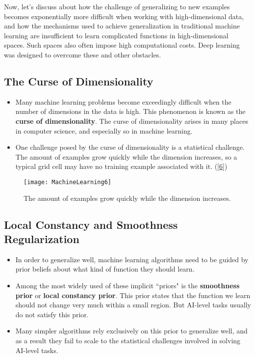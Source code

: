     Now, let's discuss about how the challenge of generalizing to new examples becomes	exponentially more difficult when working with high-dimensional data, and how the mechanisms used to achieve generalization in traditional machine learning are insufficient to learn complicated functions in high-dimensional spaces. Such spaces also often impose high computational costs. Deep learning was designed to overcome these and other obstacles.


\subsection{The Curse of Dimensionality}
    \begin{itemize}
        \item Many machine learning problems become exceedingly difficult when the number of dimensions in the data is high. This phenomenon is known as the
        \textbf{curse of dimensionality}. The curse of dimensionality arises in many places in computer science, and especially so in machine learning.
        \item One challenge posed by the curse of dimensionality is a statistical challenge. The amount of examples grow quickly while the dimension increases, so a typical grid cell may have no training example associated with it. (\eqref{6})
    \end{itemize}
    \begin{figure}
        \caption{The amount of examples grow quickly while the dimension increases.}
        \texttt{[image: MachineLearning6]}\label{6}
    \end{figure}

    
\subsection{Local Constancy and Smoothness Regularization}
    \begin{itemize}
        \item In order to generalize well, machine learning algorithms need to be guided by prior beliefs about what kind of function they should learn.
        \item Among the most widely used of these implicit ``priors" is the \textbf{smoothness prior} or \textbf{local constancy prior}. This prior states that the function we learn should not change very much within a small region. But AI-level tasks usually do not satisfy this prior.
        \item Many simpler algorithms rely exclusively on this prior to generalize well, and as a result they fail to scale to the statistical challenges involved in solving AI-level tasks.
    \end{itemize}

